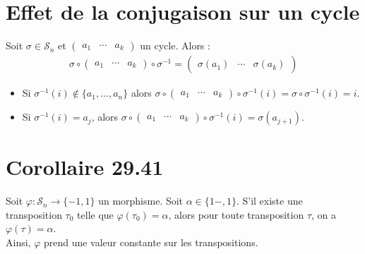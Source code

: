 \documentclass[../main.tex]{subfiles}
\begin{document}
\section{Effet de la conjugaison sur un cycle}
\begin{tcolorbox}[title=Théorème 29.40, title filled=false, colframe=orange, colback=orange!10!white]
    Soit $\sigma\in \mathcal{S}_n$ et $\begin{pmatrix}
        a_1 & \cdots & a_k
    \end{pmatrix}$ un cycle. Alors : 
    \begin{align*}
        \sigma\circ \begin{pmatrix}
            a_1 & \cdots & a_k
        \end{pmatrix} \circ \sigma^{-1} = \begin{pmatrix}
            \sigma(a_1) & \cdots & \sigma(a_k)
        \end{pmatrix}
    \end{align*}
\end{tcolorbox}

\begin{itemize}
    \item Si $\sigma^{-1}(i) \not\in \{a_1, \ldots, a_n\}$ alors $\sigma\circ \begin{pmatrix}
        a_1 & \cdots & a_k
    \end{pmatrix} \circ \sigma^{-1}(i) = \sigma\circ \sigma^{-1}(i) = i$. 
    \item Si $\sigma^{-1}(i) = a_j$, alors $\sigma\circ \begin{pmatrix}
        a_1 & \cdots & a_k
    \end{pmatrix} \circ \sigma^{-1}(i) =  \sigma(a_{j+1})$. 
\end{itemize}

\section{Corollaire 29.41}
\begin{tcolorbox}[title=Corollaire 29.41, title filled=false, colframe=orange, colback=orange!10!white]
    Soit $\varphi:\mathcal{S}_n\to \{ -1, 1 \}$ un morphisme. Soit $\alpha\in \{ 1-, 1 \}$. S'il existe une transposition $\tau_0$ telle que $\varphi(\tau_0) = \alpha$, alors pour toute transposition $\tau$, on a $\varphi(\tau) = \alpha$. \\
    Ainsi, $\varphi$ prend une valeur constante sur les transpositions.
\end{tcolorbox}
\end{document}
